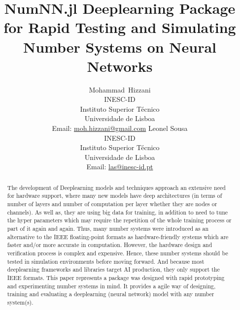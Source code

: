 \documentclass{article}
\title{NumNN.jl Deeplearning Package for Rapid Testing and Simulating Number Systems on Neural Networks}
\author{%
	{Mohammad~Hizzani}\\
	{INESC-ID\\ Instituto Superior Técnico\\ Universidade de Lisboa\\
		Email: \href{mailto:moh.hizzani@gmail.com}{moh.hizzani@gmail.com}}
	\AND
	{Leonel Sousa}\\
	{INESC-ID\\ Instituto Superior Técnico\\ Universidade de Lisboa\\
		Email: \href{mailto:las@inesc-id.pt}{las@inesc-id.pt}}
}
\begin{document}
	\maketitle

	\begin{abstract}
		The development of Deeplearning models and techniques approach an extensive need for hardware support, where many new models have deep architectures (in terms of number of layers and number of computation per layer whether they are nodes or channels). As well as, they are using big data for training, in addition to need to tune the hyper parameters which may require the repetition of the whole training process or part of it again and again. Thus, many number systems were introduced as an alternative to the IEEE floating-point formats as hardware-friendly systems which are faster and/or more accurate in computation. However, the hardware design and verification process is complex and expensive. Hence, these number systems should be tested in simulation environments before moving forward. And because most deeplearning frameworks and libraries target AI production, they only support the IEEE formats. This paper represents a package was designed with rapid prototyping and experimenting number systems in mind. It provides a agile way of designing, training and evaluating a deeplearning (neural network) model with any number system(s).
	\end{abstract}

	
	
	
	
	
%	
	
	
	
\end{document}
